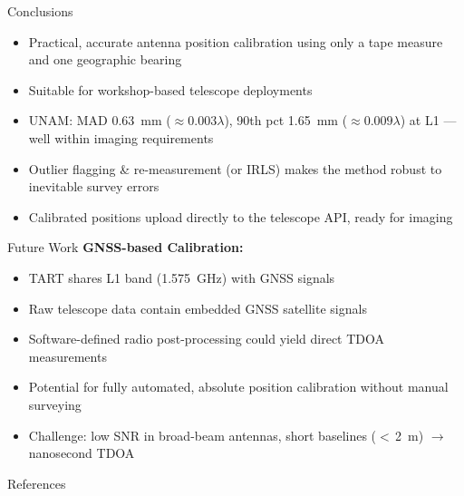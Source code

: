 \documentclass[ignorenonframetext]{beamer}
\begin{document}

\begin{frame}{Conclusions}
\begin{itemize}
  \item Practical, accurate antenna position calibration using only a tape measure and one geographic bearing
  \item Suitable for workshop-based telescope deployments
  \item UNAM: MAD 0.63~mm ($\approx 0.003\lambda$), 90th pct 1.65~mm ($\approx 0.009\lambda$) at L1 --- well within imaging requirements
  \item Outlier flagging \& re-measurement (or IRLS) makes the method robust to inevitable survey errors
  \item Calibrated positions upload directly to the telescope API, ready for imaging
\end{itemize}
\end{frame}


\begin{frame}{Future Work}
\vspace{-4pt}
\textbf{GNSS-based Calibration:}
\begin{itemize}
  \item TART shares L1 band (1.575~GHz) with GNSS signals
  \item Raw telescope data contain embedded GNSS satellite signals
  \item Software-defined radio post-processing could yield direct TDOA measurements
  \item Potential for fully automated, absolute position calibration without manual surveying
  \item Challenge: low SNR in broad-beam antennas, short baselines ($<$\,2~m) $\to$ nanosecond TDOA
\end{itemize}
\end{frame}

\begin{frame}[allowframebreaks]{References}


\end{frame}
\end{document}
